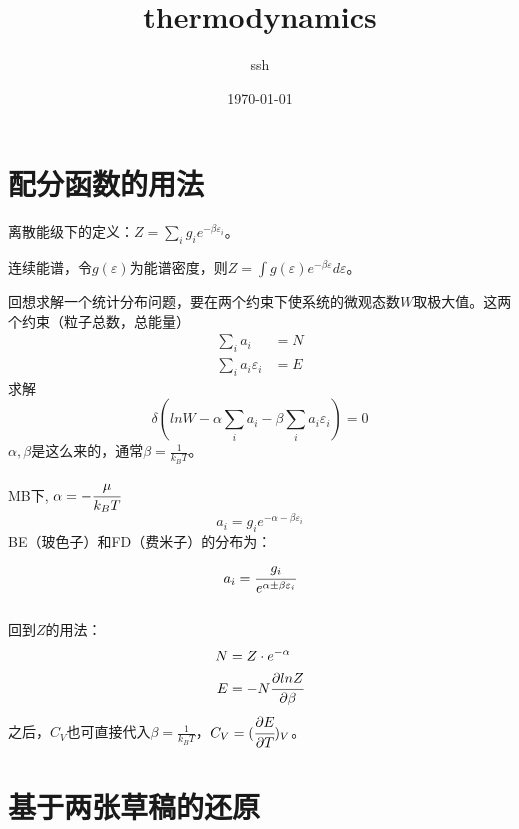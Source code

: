 \documentclass[a4paper,12pt]{article}
\title{thermodynamics}
\author{ssh}
\date{\today}
\begin{document}
\maketitle

\section{配分函数的用法}
离散能级下的定义：$Z = \sum_i g_i e^{-\beta \varepsilon_i}$。\par
连续能谱，令$g(\varepsilon)$为能谱密度，则$Z = \int g(\varepsilon) e^{- \beta \varepsilon} d\varepsilon$。\par
回想求解一个统计分布问题，要在两个约束下使系统的微观态数$W$取极大值。这两个约束（粒子总数，总能量）
\begin{subequations}
\begin{align}
\sum_i a_i &= N \\
\sum_i a_i \varepsilon_i & = E
\end{align}
\end{subequations}
求解
\begin{equation}
\delta (lnW - \alpha \sum_i a_i - \beta \sum_i a_i \varepsilon_i) = 0
\end{equation}
$\alpha, \beta$是这么来的，通常$\beta = \frac{1}{k_B T}$。\par
MB下, $\alpha = - \cfrac{\mu}{k_B T}$
\begin{equation}
a_i = g_i e^{-\alpha - \beta \varepsilon_i}
\end{equation}
BE（玻色子）和FD（费米子）的分布为：
\begin{equation}
a_i = \cfrac{g_i}{e^{\alpha \pm \beta \varepsilon_i}}
\end{equation}
\\
\indent 回到$Z$的用法：
\begin{subequations}
\begin{align}
N &= Z \cdot e^{-\alpha} \\
E &= -N \cfrac{\partial ln Z}{\partial \beta} 
\end{align}
\end{subequations}
之后，$C_V$也可直接代入$\beta = \frac{1}{k_B T}$，$C_V = (\cfrac{\partial E}{\partial T})_V$。


\section{基于两张草稿的还原}
\end{document}
